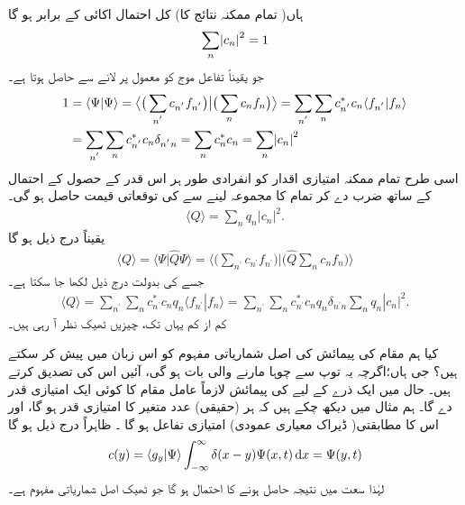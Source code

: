  ہاں( تمام ممکنہ نتائج کا)   کل احتمال  اکائی کے برابر  ہو گا
\begin{align}
\sum_{n} \abs{c_{n}}^{2} = 1
\end{align}
جو یقیناً تفاعل موج کو معمول پر لانے سے حاصل ہوتا ہے۔
\begin{gather}
\begin{aligned}
1 &= \langle \Psi | \Psi \rangle = \big\langle \big( \sum_{n^{'}}c_{n^{'}}f_{n^{'}}\big) \big | \big( \sum_{n} c_{n}f_{n} \big) \big\rangle = \sum_{n^{'}}\sum_{n} c_{n^{'}}^{*}c_{n}\langle f_{n^{'}} | f_{n} \rangle \\
&= \sum_{n^{'}}\sum_{n} c_{n^{'}}^{*}c_{n} \delta_{n^{'}n} = \sum_{n}c_{n}^{*}c_{n} = \sum_{n}\abs{c_{n}}^{2}
\end{aligned}
\end{gather}
اسی طرح تمام ممکنہ امتیازی اقدار کو انفرادی طور ہر اس قدر کے حصول کے احتمال کے ساتھ ضرب دے کر تمام کا مجموعہ لینے سے     کی توقعاتی قیمت حاصل  ہو گی۔
\begin{align}
\langle Q \rangle = \sum_{n}q_{n}|c_{n}|^{2}.
\end{align}
یقیناً درج ذیل ہو گا 
\begin{align}
\langle Q \rangle = \langle \Psi | \hat{Q} \Psi \rangle =  \big\langle \big( \sum_{n^{'}}c_{n^{'}}f_{n^{'}}\big) \big | \big( \hat{Q} \sum_{n} c_{n}f_{n} \big) \big \rangle
\end{align}
جسے     کی بدولت   درج ذیل   لکھا جا سکتا ہے۔
\begin{align}
\langle Q \rangle = \sum_{n^{'}}\sum_{n} c_{n^{'}}^{*}c_{n} q_{n} \langle f_{n^{'}} | f_{n} \rangle = \sum_{n^{'}}\sum_{n} c_{n^{'}}^{*}c_{n} q_{n} \delta_{n^{'}n} \sum_{n}q_{n}|c_{n}|^{2}.
\end{align}
کم از کم یہاں تک،  چیزیں ٹھیک نظر آ رہی ہیں۔

کیا ہم مقام کی پیمائش کی اصل شماریاتی مفہوم کو اس زبان میں پیش کر سکتے ہیں؟ جی ہاں؛اگرچہ یہ  توپ سے چوہا مارنے والی بات ہو گی، آئیں اس کی تصدیق کرتے ہیں۔ حال  میں ایک ذرے کے لیے  کی پیمائش لازماً عامل مقام کا کوئی ایک امتیازی قدر دے گا۔ ہم مثال  میں دیکھ چکے ہیں کہ ہر (حقیقی)  عدد  متغیر  کا امتیازی قدر ہو گا،  اور اس کا مطابقتی( ڈیراک معیاری عمودی)  امتیازی تفاعل  ہو گا ۔ ظاہراً  درج ذیل ہو گا
\begin{align}
c(y) = \langle g_{y} | \Psi \rangle  \int_{-\infty}^{\infty} \delta(x-y) \Psi(x,t)\dif x = \Psi(y,t)
\end{align}
لہٰذا  سعت   میں نتیجہ  حاصل ہونے کا احتمال  ہو گا جو ٹھیک اصل شماریاتی مفہوم ہے۔

